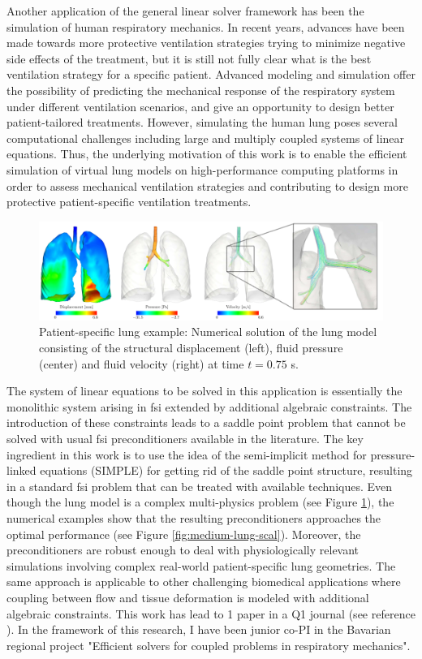 \documentclass{article}
\newcommand{\bemph}[1]{#1}
\begin{document}
Another application of the general linear solver framework has been the simulation of human respiratory mechanics. In recent years, advances have been made towards more protective ventilation strategies \cite{Tobin2001} trying to minimize negative side effects of the treatment, but it is still not fully clear what is the best ventilation strategy for a specific patient. Advanced modeling and simulation offer the possibility of predicting the mechanical response of the respiratory system under different ventilation scenarios, and give an opportunity to design better patient-tailored treatments. However, simulating the human lung poses several computational challenges including large and multiply coupled systems of linear equations. Thus, the underlying motivation of this work is to enable the efficient simulation of virtual lung models on high-performance computing platforms in order to assess mechanical ventilation strategies and contributing to design more protective patient-specific ventilation treatments.

\begin{figure}[ht!]
\centering
\includegraphics[width=\textwidth]{../_assets/fig15.png}
\caption{Patient-specific lung example: Numerical solution of the lung model consisting of the structural displacement (left), fluid pressure (center) and fluid velocity (right) at time $t=0.75$ s.}
\label{fig:lung-sol}
\end{figure}

The system of linear equations to be solved  in this application is essentially the monolithic system arising in \ac{fsi} extended by additional algebraic constraints. The introduction of these constraints leads to a saddle point problem that cannot be solved with usual \ac{fsi} preconditioners available in the literature. The key ingredient in this work is to use the idea of the semi-implicit method for pressure-linked equations (SIMPLE) for getting rid of the saddle point structure, resulting in a standard \ac{fsi} problem that can be treated with available techniques. Even though the lung model is a complex multi-physics problem (see Figure \ref{fig:lung-sol}), the numerical examples show that the resulting preconditioners approaches the optimal performance (see Figure \ref{fig:medium-lung-scal}). Moreover, the preconditioners are robust enough to deal with physiologically relevant simulations involving complex real-world patient-specific lung geometries. The same approach is applicable to other challenging biomedical applications where coupling between flow and tissue deformation is modeled with additional algebraic constraints. \bemph{This work has lead to 1 paper in a Q1 journal} (see reference \cite{verdugo_efficient_2016}). In the framework of this research, \bemph{I have been junior co-PI in the Bavarian regional project "Efficient solvers for coupled problems in respiratory mechanics"}. 
\end{document}
